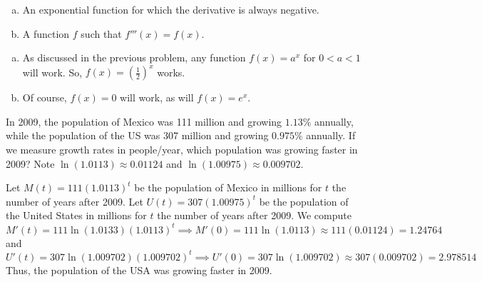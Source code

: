 \documentclass[11pt]{exam}
\begin{document}
\begin{questions}
\begin{enumerate}[(a)]
\item An exponential function for which the derivative is always negative. 
\item A function $f$ such that $f'''(x)=f(x)$. 
\end{enumerate}
\begin{solution}
  \begin{enumerate}[(a)]
  \item As discussed in the previous problem, any function
    \(f(x) = a^x\) for \(0 < a < 1\) will work. So,
    \(f(x) = \left( \frac{1}{2} \right)^x\) works.
  \item Of course, \(f(x) = 0\) will work, as will \(f(x) = e^x\).
  \end{enumerate}
\end{solution}
\vspace{0.5in}
\question In 2009, the population of Mexico was 111 million and
  growing $1.13\%$ annually, while the population of the US was 307
  million and growing $0.975\%$ annually. If we measure growth rates
  in people/year, which population was growing faster in 2009? Note
  \(\ln(1.0113) \approx 0.01124\) and \(\ln(1.00975) \approx 0.009702\).
  \begin{solution}
    Let \(M(t) = 111(1.0113)^t\) be the population of Mexico in
    millions for \(t\) the number of years after 2009. Let \(U(t) =
    307(1.00975)^t\) be the population of the United States in
    millions for \(t\) the number of years after 2009. We compute \[
      M'(t) =  111 \ln(1.0133) (1.0113)^t \implies M'(0) = 111
      \ln(1.0113) \approx 111(0.01124) = 1.24764
    \]
    and \[
      U'(t) = 307 \ln(1.009702) (1.009702)^t \implies U'(0) = 307
      \ln(1.009702) \approx 307(0.009702) = 2.978514
    \]
    Thus, the population of the USA was growing faster in 2009.
  \end{solution}
\end{questions}
\end{document}

